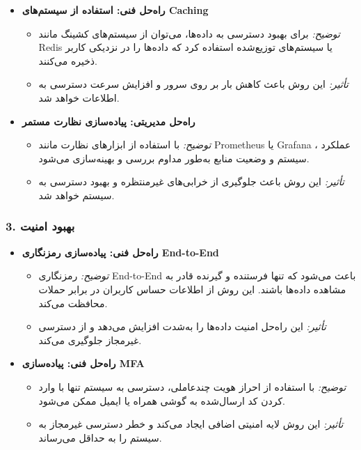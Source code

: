 \begin{itemize}
    \item \textbf{راه‌حل فنی: استفاده از سیستم‌های Caching}
    \begin{itemize}
        \item \textit{توضیح:} برای بهبود دسترسی به داده‌ها، می‌توان از سیستم‌های کشینگ مانند Redis یا سیستم‌های توزیع‌شده استفاده کرد که داده‌ها را در نزدیکی کاربر ذخیره می‌کنند.
        \item \textit{تأثیر:} این روش باعث کاهش بار بر روی سرور و افزایش سرعت دسترسی به اطلاعات خواهد شد.
    \end{itemize}
    
    \item \textbf{راه‌حل مدیریتی: پیاده‌سازی نظارت مستمر}
    \begin{itemize}
        \item \textit{توضیح:} با استفاده از ابزارهای نظارت مانند Prometheus یا Grafana ، عملکرد سیستم و وضعیت منابع به‌طور مداوم بررسی و بهینه‌سازی می‌شود.
        \item \textit{تأثیر:} این روش باعث جلوگیری از خرابی‌های غیرمنتظره و بهبود دسترسی به سیستم خواهد شد.
    \end{itemize}
\end{itemize}

\subsubsection*{3. بهبود امنیت}

\begin{itemize}
    \item \textbf{راه‌حل فنی: پیاده‌سازی رمزنگاری End-to-End}
    \begin{itemize}
        \item \textit{توضیح:} رمزنگاری End-to-End باعث می‌شود که تنها فرستنده و گیرنده قادر به مشاهده داده‌ها باشند. این روش از اطلاعات حساس کاربران در برابر حملات محافظت می‌کند.
        \item \textit{تأثیر:} این راه‌حل امنیت داده‌ها را به‌شدت افزایش می‌دهد و از دسترسی غیرمجاز جلوگیری می‌کند.
    \end{itemize}
    
    \item \textbf{راه‌حل فنی: پیاده‌سازی MFA}
    \begin{itemize}
        \item \textit{توضیح:} با استفاده از احراز هویت چندعاملی، دسترسی به سیستم تنها با وارد کردن کد ارسال‌شده به گوشی همراه یا ایمیل ممکن می‌شود.
        \item \textit{تأثیر:} این روش لایه امنیتی اضافی ایجاد می‌کند و خطر دسترسی غیرمجاز به سیستم را به حداقل می‌رساند.
    \end{itemize}
\end{itemize}

